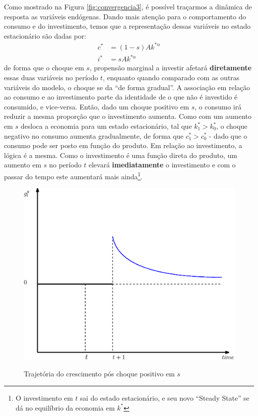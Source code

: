 \documentclass[11pt,a4paper]{article}
\begin{document}
Como mostrado na Figura \ref{fig:convergencia3}, é possível traçarmos a dinâmica de resposta as variáveis endógenas. Dando mais atenção para o comportamento do consumo e do investimento, temos que a representação dessas variáveis no estado estacionário são dadas por:
\begin{align*}
c^{\ast} &= (1-s)Ak^{\ast \alpha}\\
i^{\ast} &= sAk^{\ast \alpha}
\end{align*}
\noindent
de forma que o choque em $s$, propensão marginal a investir afetará \textbf{diretamente} essas duas variáveis no período $t$, enquanto quando comparado com as outras variáveis do modelo, o choque se da ``de forma gradual''. A associação em relação ao consumo e ao investimento parte da identidade de o que não é investido é consumido, e vice-versa. Então, dado um choque positivo em $s$, o consumo irá reduzir a mesma proporção que o investimento aumenta. Como com um aumento em $s$ desloca a economia para um estado estacionário, tal que $k_1^{\ast}>k_0^{\ast}$, o choque negativo no consumo aumenta gradualmente, de forma que $c_1 ^{\ast} > c_0 ^{\ast}$ - dado que o consumo pode ser posto em função do produto. Em relação ao investimento, a lógica é a mesma. Como o investimento é uma função direta do produto, um aumento em $s$ no período $t$ elevará \textbf{imediatamente} o investimento e com o passar do tempo este aumentará mais ainda\footnote{O investimento em $t$ sai do estado estacionário, e seu novo ``Steady State'' se dá no equilíbrio da economia em $k^{\ast}$}.  

\begin{figure}[!h]
\centering
\caption{Trajetória do crescimento pós choque positivo em $s$} \vspace{2ex}
\includegraphics[scale=.4]{solow05.eps}
\label{fig:convergencia4}
\end{figure} 
\end{document}

